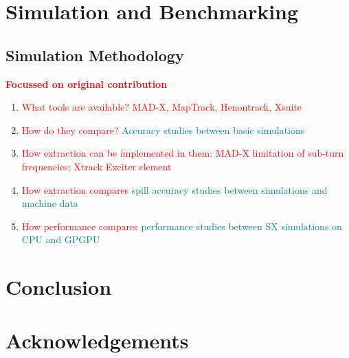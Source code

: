 \documentclass[11pt]{report}
\newcommand\todo[1]{\textcolor{red}{#1}}
\begin{document}
\chapter{Simulation and Benchmarking}
\section{Simulation Methodology}
\todo{\textbf{Focussed on original contribution}}
\begin{enumerate}
    \item \todo{What tools are available? MAD-X, MapTrack, Henontrack, Xsuite}
    \item \todo{How do they compare?} \textcolor{teal}{Accuracy studies between basic simulations}
    \item \todo{How extraction can be implemented in them: MAD-X limitation of sub-turn frequencies; Xtrack Exciter element}
    \item \todo{How extraction compares} \textcolor{teal}{spill accuracy studies between simulations and machine data}
    \item \todo{How performance compares} \textcolor{teal}{performance studies between SX simulations on CPU and GPGPU}
\end{enumerate}

\chapter{Conclusion}

\chapter{Acknowledgements}

 

\end{document}
